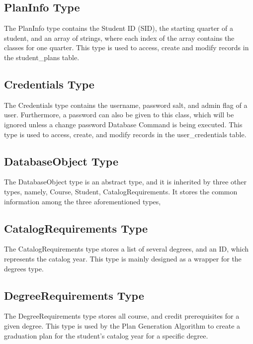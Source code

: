 \documentclass[letterpaper]{report}
\begin{document}
	\subsection{PlanInfo Type}
	The PlanInfo type contains the Student ID (SID), the starting quarter of a student, and an array of strings, where each index of the array contains the classes for one quarter. This type is used to access, create and modify records in the student\_plans table. 
	\subsection{Credentials Type}
	The Credentials type contains the username, password salt, and admin flag of a user. Furthermore, a password can also be given to this class, which will be ignored unless a change password Database Command is being executed. This type is used to access, create, and modify records in the user\_credentials table.
	\subsection{DatabaseObject Type}
	The DatabaseObject type is an abstract type, and it is inherited by three other types, namely, Course, Student, CatalogRequirements. It stores the common information among the three aforementioned types,  
	\subsection{CatalogRequirements Type}
	The CatalogRequirements type stores a list of several degrees, and an ID, which represents the catalog year. This type is mainly designed as a wrapper for the degrees type.
	\subsection{DegreeRequirements Type}
	The DegreeRequirements type stores all course, and credit prerequisites for a given degree. This type is used by the Plan Generation Algorithm to create a graduation plan for the student's catalog year for a specific degree.
\end{document}
